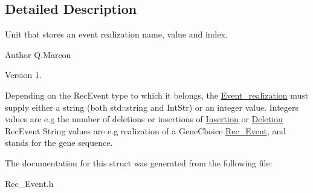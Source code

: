 \subsection{Detailed Description}
Unit that stores an event realization name, value and index. 

\begin{DoxyAuthor}{Author}
Q.\+Marcou 
\end{DoxyAuthor}
\begin{DoxyVersion}{Version}
1.
\end{DoxyVersion}
Depending on the Rec\+Event type to which it belongs, the \hyperlink{structEvent__realization}{Event\+\_\+realization} must supply either a string (both std\+::string and Int\+Str) or an integer value. Integers values are e.\+g the number of deletions or insertions of \hyperlink{classInsertion}{Insertion} or \hyperlink{classDeletion}{Deletion} Rec\+Event String values are e.\+g realization of a Gene\+Choice \hyperlink{classRec__Event}{Rec\+\_\+\+Event}, and stands for the gene sequence. 

The documentation for this struct was generated from the following file\+:\begin{DoxyCompactItemize}
\item 
Rec\+\_\+\+Event.\+h\end{DoxyCompactItemize}
